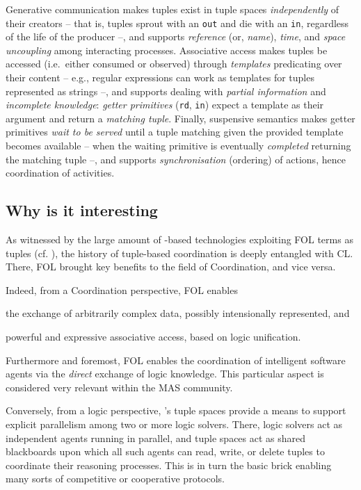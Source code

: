 \documentclass[12pt,a4paper,openright,twoside]{book}
\begin{document}
Generative communication makes tuples exist in tuple spaces \emph{independently} of their creators -- that is, tuples sprout with an \texttt{out} and die with an \texttt{in}, regardless of the life of the producer --, and supports \emph{reference} (or, \emph{name}), \emph{time}, and \emph{space uncoupling} among interacting processes.
%
Associative access makes tuples be accessed (i.e.\ either consumed or observed) through \emph{templates} predicating over their content -- e.g., regular expressions can work as templates for tuples represented as strings --, and supports dealing with \emph{partial information} and \emph{incomplete knowledge}: \emph{getter primitives} (\texttt{rd}, \texttt{in}) expect a template as their argument and return a \emph{matching tuple}.
%
Finally, suspensive semantics makes getter primitives \emph{wait to be served} until a tuple matching given the provided template becomes available -- when the waiting primitive is eventually \emph{completed} returning the matching tuple --, and supports \emph{synchronisation} (ordering) of actions, hence coordination of activities.

\subsection{Why is it interesting}

As witnessed by the large amount of \linda{}-based technologies exploiting FOL terms as tuples (cf. \cite{coordination-jlamp2020}), the history of tuple-based coordination is deeply entangled with CL.
%
There, FOL brought key benefits to the field of Coordination, and vice versa.

Indeed, from a Coordination perspective, FOL enables
%
\begin{inlinelist}
    \item the exchange of arbitrarily complex data, possibly intensionally represented, and
    \item powerful and expressive associative access, based on logic unification.
\end{inlinelist}
%
Furthermore and foremost, FOL enables the coordination of intelligent software agents via the \emph{direct} exchange of logic knowledge.
%
This particular aspect is considered very relevant within the MAS community.

Conversely, from a logic perspective, \linda{}'s tuple spaces provide a means to support explicit parallelism among two or more logic solvers.
%
There, logic solvers act as independent agents running in parallel, and tuple spaces act as shared blackboards upon which all such agents can read, write, or delete tuples to coordinate their reasoning processes.
%
This is in turn the basic brick enabling many sorts of competitive or cooperative protocols.
\end{document}
